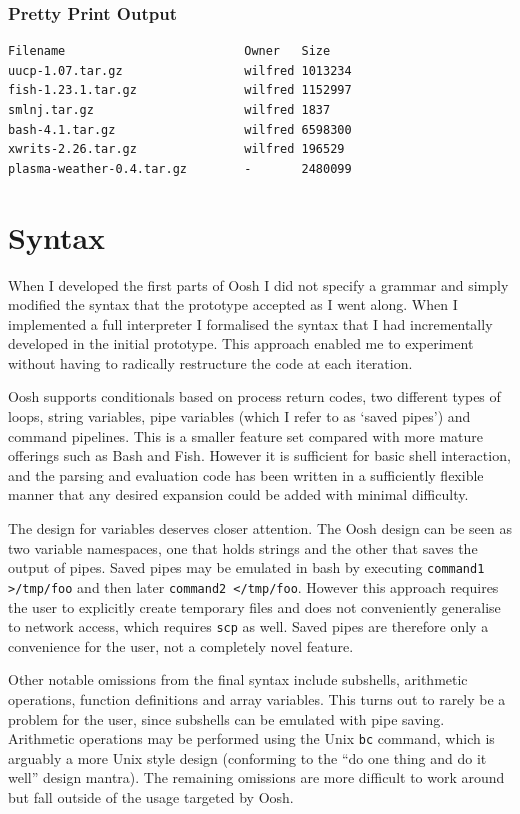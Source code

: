 \documentclass[12pt,twoside,notitlepage]{report}
\begin{document}
\subsubsection{Pretty Print Output}
\begin{verbatim}
Filename                         Owner   Size      
uucp-1.07.tar.gz                 wilfred 1013234   
fish-1.23.1.tar.gz               wilfred 1152997   
smlnj.tar.gz                     wilfred 1837      
bash-4.1.tar.gz                  wilfred 6598300   
xwrits-2.26.tar.gz               wilfred 196529    
plasma-weather-0.4.tar.gz        -       2480099
\end{verbatim}

\section{Syntax}
When I developed the first parts of Oosh I did not specify a grammar and simply
modified the syntax that the prototype accepted as I went along. When I
implemented a full interpreter I formalised the syntax that I had
incrementally developed in the initial prototype. This
approach enabled me to experiment without having to radically restructure the
code at each iteration.

Oosh supports conditionals based on process return codes, two
different types of loops, string variables, pipe variables (which I
refer to as `saved pipes') and command pipelines. This is a smaller
feature set compared with more mature offerings such as Bash and
Fish. However it is sufficient for basic shell interaction, and the
parsing and evaluation code has been written in a sufficiently
flexible manner that any desired expansion could be added with minimal
difficulty.

The design for variables deserves closer attention. The Oosh design
can be seen as two variable namespaces, one that holds strings and the
other that saves the output of pipes. Saved pipes may be emulated in
bash by executing {\tt command1 >/tmp/foo} and then later {\tt command2
  </tmp/foo}. However this approach requires the user to explicitly
create temporary files and does not conveniently generalise to network
access, which requires {\tt scp} as well. Saved pipes are therefore
only a convenience for the user, not a completely novel feature.

Other notable omissions from the final syntax include subshells,
arithmetic operations, function definitions and array variables. This
turns out to rarely be a problem for the user, since subshells can be
emulated with pipe saving. Arithmetic operations may be performed
using the Unix {\tt bc} command, which is arguably a more Unix style
design (conforming to the ``do one thing and do it well'' design
mantra). The remaining omissions are more difficult to work around but
fall outside of the usage targeted by Oosh.
\end{document}
